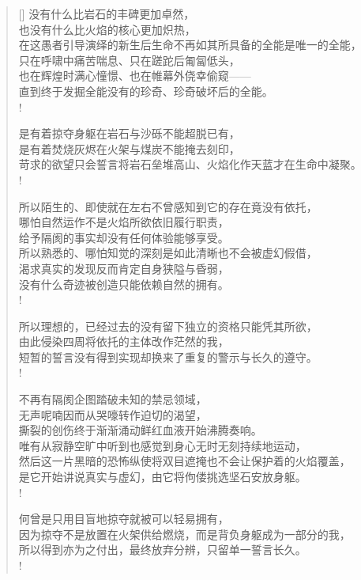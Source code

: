 \documentclass[UTF8, 12pt, a4paper]{ctexrep} %
\begin{document}
\begin{verse}[\versewidth]
没有什么比岩石的丰碑更加卓然，\\
也没有什么比火焰的核心更加炽热，\\
在这愚者引导演绎的新生后生命不再如其所具备的全能是唯一的全能，\\
只在呼啸中痛苦喘息、只在蹉跎后匍匐低头，\\
也在辉煌时满心憧憬、也在帷幕外侥幸偷窥——\\
直到终于发掘全能没有的珍奇、珍奇破坏后的全能。\\!

是有着掠夺身躯在岩石与沙砾不能超脱已有，\\
是有着焚烧灰烬在火架与煤炭不能掩去刻印，\\
苛求的欲望只会誓言将岩石垒堆高山、火焰化作天蓝才在生命中凝聚。\\!

所以陌生的、即使就在左右不曾感知到它的存在竟没有依托，\\
哪怕自然运作不是火焰所欲依旧履行职责，\\
给予隔阂的事实却没有任何体验能够享受。\\
所以熟悉的、哪怕知觉的深刻是如此清晰也不会被虚幻假借，\\
渴求真实的发现反而肯定自身狭隘与昏弱，\\
没有什么奇迹被创造只能依赖自然的拥有。\\!

所以理想的，已经过去的没有留下独立的资格只能凭其所欲，\\
由此侵染四周将依托的主体改作茫然的我，\\
短暂的誓言没有得到实现却换来了重复的警示与长久的遵守。\\!

不再有隔阂企图踏破未知的禁忌领域，\\
无声呢喃因而从哭嚎转作迫切的渴望，\\
撕裂的创伤终于渐渐涌动鲜红血液开始沸腾奏响。\\
唯有从寂静空旷中听到也感觉到身心无时无刻持续地运动，\\
然后这一片黑暗的恐怖纵使将双目遮掩也不会让保护着的火焰覆盖，\\
是它开始讲说真实与虚幻，由它将佝偻挑选坚石安放身躯。\\!

何曾是只用目盲地掠夺就被可以轻易拥有，\\
因为掠夺不是放置在火架供给燃烧，而是背负身躯成为一部分的我，\\
所以得到亦为之付出，最终放弃分辨，只留单一誓言长久。\\!


\end{verse}
\end{document}
